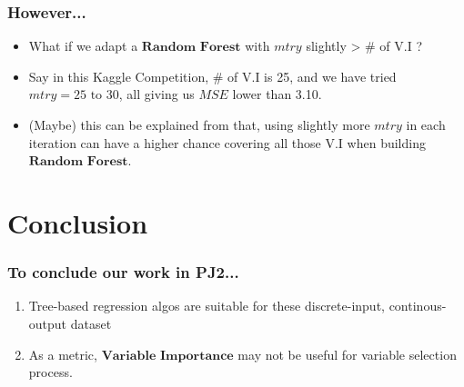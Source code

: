 \documentclass{beamer}
\begin{document}
\begin{frame}
\frametitle{However...}
\begin{itemize}
	\item What if we adapt a $\textbf{Random Forest}$ with $mtry$ slightly > \# of V.I ?
	\item Say in this Kaggle Competition, \# of V.I is 25, and we have tried $mtry = 25 \text{ to } 30$, all giving us $MSE$ lower than 3.10.
	\item (Maybe) this can be explained from that, using slightly more $mtry$ in each iteration can have a higher chance covering all those V.I when building  $\textbf{Random Forest}$.
\end{itemize}
\end{frame}


\section{Conclusion}
\begin{frame}
\frametitle{To conclude our work in PJ2...}
\begin{enumerate}
	\item Tree-based regression algos are suitable for these discrete-input, continous-output dataset
	\item As a metric, $\textbf{Variable Importance}$ may not be useful for variable selection process.
\end{enumerate}
\end{frame}
\end{document}
